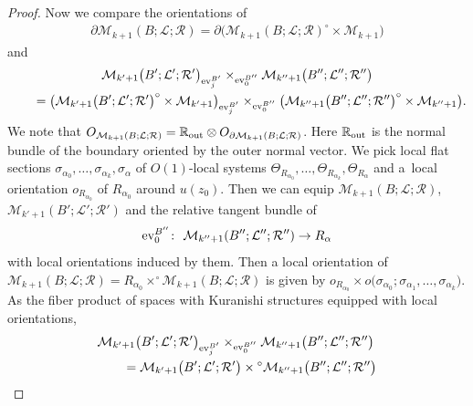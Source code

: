 \documentclass[pdftex]{sigma}
\numberwithin{equation}{section}
\theoremstyle{definition}
\begin{document}
\begin{proof}
Now we compare the orientations of
\begin{gather*}
\partial {\mathcal M}_{k+1}(B;{\mathcal L};{\mathcal R})= \partial \bigl( {\mathcal M}_{k+1}(B;{\mathcal L};{\mathcal R})^{\circ} \times {\mathcal M}_{k+1} \bigr)
\end{gather*}
and
\begin{gather*}
{\mathcal M}_{k'+1}\bigl(B';{\mathcal L}';{\mathcal R}'\bigr)_{{\rm ev}_j^{B'}} \times_{{\rm ev}_0^{B''}} {\mathcal M}_{k''+1}\bigl(B'';{\mathcal L}'';{\mathcal R}''\bigr)\\
\qquad{}
=\bigl( {\mathcal M}_{k'+1}\bigl(B';{\mathcal L}';{\mathcal R}'\bigr)^{\circ} \times {\mathcal M}_{k'+1} \bigr)_{{\rm ev}_j^{B'}} \times_{{\rm ev}_0^{B''}}
\bigl( {\mathcal M}_{k''+1}\bigl(B'';{\mathcal L}'';{\mathcal R}''\bigr)^{\circ} \times {\mathcal M}_{k''+1} \bigr).
\end{gather*}
We note that $O_{{\mathcal M}_{k+1}(B;{\mathcal L};{\mathcal R}) } = {\mathbb R}_{{\rm out}} \otimes O_{\partial {\mathcal M}_{k+1}(B;{\mathcal L};{\mathcal R})}$.
Here ${\mathbb R}_{\rm out}$ is the normal bundle of the boundary oriented by the outer normal vector.
We pick local flat sections $\sigma_{\alpha_0}, \dots, \sigma_{\alpha_k}, \sigma_{\alpha}$ of $O(1)$-local systems $\Theta_{R_{\alpha_0}}, \dots, \Theta_{R_{\alpha_k}}, \Theta_{R_{\alpha}}$ and a~local orientation ${\mathit o}_{R_{\alpha_0}}$ of $R_{\alpha_0}$ around $u(z_0)$. Then we can equip
${\mathcal M}_{k+1}(B;{\mathcal L};{\mathcal R})$, ${\mathcal M}_{k'+1}(B';{\mathcal L}';{\mathcal R}')$ and the relative tangent bundle of
\[
{\rm ev}_0^{B''}\colon \ \mathcal M_{k''+1}(B'';{\mathcal L}'';{\mathcal R}'') \to R_{\alpha}
\]
with local orientations induced by them.
Then a local orientation of ${\mathcal M}_{k+1}(B;{\mathcal L};{\mathcal R}) = R_{\alpha_0} \times^{\circ}{\mathcal M}_{k+1}(B;{\mathcal L};{\mathcal R})$ is given by
${\mathit o}_{R_{\alpha_0}} \times o\bigl(\sigma_{\alpha_0};\sigma_{\alpha_1}, \dots, \sigma_{\alpha_k}\bigr)$.
As the fiber product of spaces with Kuranishi structures equipped with local orientations,
\begin{gather*}
\begin{split}
& {\mathcal M}_{k'+1}\bigl(B';{\mathcal L}';{\mathcal R}'\bigr)_{{\rm ev}_j^{B'}} \times_{{\rm ev}_0^{B''}} {\mathcal M}_{k''+1}\bigl(B'';{\mathcal L}'';{\mathcal R}''\bigr)\\
& \qquad{}= {\mathcal M}_{k'+1}\bigl(B';{\mathcal L}';{\mathcal R}'\bigr) \times {}^{\circ}{\mathcal M}_{k''+1}\bigl(B'';{\mathcal L}'';{\mathcal R}''\bigr)

\end{split}
\end{gather*}
\end{proof}
\end{document}
